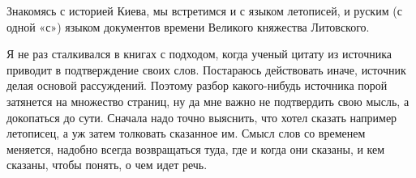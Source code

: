 Знакомясь с историей Киева, мы встретимся и с языком летописей, и руским (с одной «с») языком документов времени Великого княжества Литовского. 

Я не раз сталкивался в книгах с подходом, когда ученый цитату из источника приводит в подтверждение своих слов. Постараюсь действовать иначе, источник делая основой рассуждений. Поэтому разбор какого-нибудь источника порой затянется на множество страниц, ну да мне важно не подтвердить свою мысль, а докопаться до сути. Сначала надо точно выяснить, что хотел сказать например летописец, а уж затем толковать  сказанное им. Смысл слов со временем меняется, надобно всегда возвращаться туда, где и когда они сказаны, и кем сказаны, чтобы понять, о чем идет речь.
